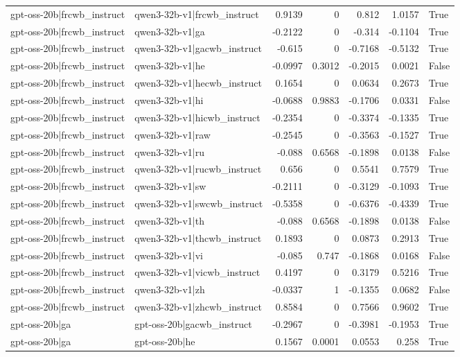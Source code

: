 \begin{table}
\begin{tabular}{l l r r r r l}
gpt-oss-20b|frcwb_instruct & qwen3-32b-v1|frcwb_instruct & 0.9139 & 0 & 0.812 & 1.0157 & True \\
gpt-oss-20b|frcwb_instruct & qwen3-32b-v1|ga & -0.2122 & 0 & -0.314 & -0.1104 & True \\
gpt-oss-20b|frcwb_instruct & qwen3-32b-v1|gacwb_instruct & -0.615 & 0 & -0.7168 & -0.5132 & True \\
gpt-oss-20b|frcwb_instruct & qwen3-32b-v1|he & -0.0997 & 0.3012 & -0.2015 & 0.0021 & False \\
gpt-oss-20b|frcwb_instruct & qwen3-32b-v1|hecwb_instruct & 0.1654 & 0 & 0.0634 & 0.2673 & True \\
gpt-oss-20b|frcwb_instruct & qwen3-32b-v1|hi & -0.0688 & 0.9883 & -0.1706 & 0.0331 & False \\
gpt-oss-20b|frcwb_instruct & qwen3-32b-v1|hicwb_instruct & -0.2354 & 0 & -0.3374 & -0.1335 & True \\
gpt-oss-20b|frcwb_instruct & qwen3-32b-v1|raw & -0.2545 & 0 & -0.3563 & -0.1527 & True \\
gpt-oss-20b|frcwb_instruct & qwen3-32b-v1|ru & -0.088 & 0.6568 & -0.1898 & 0.0138 & False \\
gpt-oss-20b|frcwb_instruct & qwen3-32b-v1|rucwb_instruct & 0.656 & 0 & 0.5541 & 0.7579 & True \\
gpt-oss-20b|frcwb_instruct & qwen3-32b-v1|sw & -0.2111 & 0 & -0.3129 & -0.1093 & True \\
gpt-oss-20b|frcwb_instruct & qwen3-32b-v1|swcwb_instruct & -0.5358 & 0 & -0.6376 & -0.4339 & True \\
gpt-oss-20b|frcwb_instruct & qwen3-32b-v1|th & -0.088 & 0.6568 & -0.1898 & 0.0138 & False \\
gpt-oss-20b|frcwb_instruct & qwen3-32b-v1|thcwb_instruct & 0.1893 & 0 & 0.0873 & 0.2913 & True \\
gpt-oss-20b|frcwb_instruct & qwen3-32b-v1|vi & -0.085 & 0.747 & -0.1868 & 0.0168 & False \\
gpt-oss-20b|frcwb_instruct & qwen3-32b-v1|vicwb_instruct & 0.4197 & 0 & 0.3179 & 0.5216 & True \\
gpt-oss-20b|frcwb_instruct & qwen3-32b-v1|zh & -0.0337 & 1 & -0.1355 & 0.0682 & False \\
gpt-oss-20b|frcwb_instruct & qwen3-32b-v1|zhcwb_instruct & 0.8584 & 0 & 0.7566 & 0.9602 & True \\
gpt-oss-20b|ga & gpt-oss-20b|gacwb_instruct & -0.2967 & 0 & -0.3981 & -0.1953 & True \\
gpt-oss-20b|ga & gpt-oss-20b|he & 0.1567 & 0.0001 & 0.0553 & 0.258 & True \\

\end{tabular}
\end{table}
